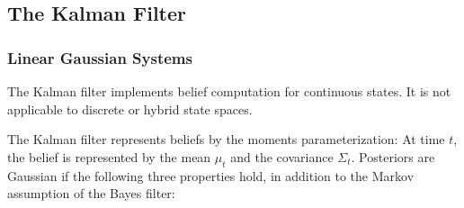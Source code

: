 \documentclass[14pt,letterpaper]{article}
\theoremstyle{definition}
\begin{document}
\subsection{The Kalman Filter}

\subsubsection{Linear Gaussian Systems}

The Kalman filter implements belief computation for continuous states.
It is not applicable to discrete or hybrid state spaces.

The Kalman filter represents beliefs by the moments parameterization: At time $t$, the belief is represented by the mean $\mu_t$ and the covariance $\Sigma_t$.
Posteriors are Gaussian if the following three properties hold, in addition to the Markov assumption of the Bayes filter:
\end{document}

